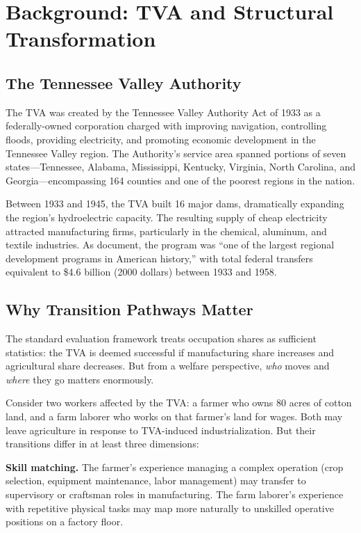 \documentclass[12pt]{article}
\begin{document}
\section{Background: TVA and Structural Transformation}
\label{sec:background}

\subsection{The Tennessee Valley Authority}

The TVA was created by the Tennessee Valley Authority Act of 1933 as a federally-owned corporation charged with improving navigation, controlling floods, providing electricity, and promoting economic development in the Tennessee Valley region. The Authority's service area spanned portions of seven states---Tennessee, Alabama, Mississippi, Kentucky, Virginia, North Carolina, and Georgia---encompassing 164 counties and one of the poorest regions in the nation.

Between 1933 and 1945, the TVA built 16 major dams, dramatically expanding the region's hydroelectric capacity. The resulting supply of cheap electricity attracted manufacturing firms, particularly in the chemical, aluminum, and textile industries. As \citet{kline2014} document, the program was ``one of the largest regional development programs in American history,'' with total federal transfers equivalent to \$4.6 billion (2000 dollars) between 1933 and 1958.

\subsection{Why Transition Pathways Matter}

The standard evaluation framework treats occupation shares as sufficient statistics: the TVA is deemed successful if manufacturing share increases and agricultural share decreases. But from a welfare perspective, \textit{who} moves and \textit{where} they go matters enormously.

Consider two workers affected by the TVA: a farmer who owns 80 acres of cotton land, and a farm laborer who works on that farmer's land for wages. Both may leave agriculture in response to TVA-induced industrialization. But their transitions differ in at least three dimensions:

\textbf{Skill matching.} The farmer's experience managing a complex operation (crop selection, equipment maintenance, labor management) may transfer to supervisory or craftsman roles in manufacturing. The farm laborer's experience with repetitive physical tasks may map more naturally to unskilled operative positions on a factory floor.
\end{document}
